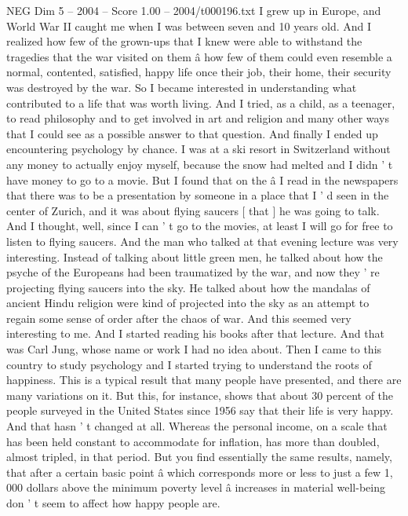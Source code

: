 \begin{textsample}{NEG Dim 5 – 2004 – Score 1.00 – 2004/t000196.txt}  \label{ex:f5_neg_066}
I grew up in Europe, and World War II caught me when I was between seven and 10 years old.
And I realized how few of the grown-ups that I knew were able to withstand the tragedies that the war visited on them â how few of them could even resemble a normal, contented, satisfied, happy life once their job, their home, their security was destroyed by the war.
So I became interested in understanding what contributed to a life that was worth living.
And I tried, as a child, as a teenager, to read philosophy and to get involved in art and religion and many other ways that I could see as a possible answer to that question.
And finally I ended up encountering psychology by chance.
I was at a ski resort in Switzerland without any money to actually enjoy myself, because the snow had melted and I didn ' t have money to go to a movie.
But I found that on the â I read in the newspapers that there was to be a presentation by someone in a place that I ' d seen in the center of Zurich, and it was about flying saucers [ that ] he was going to talk.
And I thought, well, since I can ' t go to the movies, at least I will go for free to listen to flying saucers.
And the man who talked at that evening lecture was very interesting.
Instead of talking about little green men, he talked about how the psyche of the Europeans had been traumatized by the war, and now they ' re projecting flying saucers into the sky.
He talked about how the mandalas of ancient Hindu religion were kind of projected into the sky as an attempt to regain some sense of order after the chaos of war.
And this seemed very interesting to me.
And I started reading his books after that lecture.
And that was Carl Jung, whose name or work I had no idea about.
Then I came to this country to study psychology and I started trying to understand the roots of happiness.
This is a typical result that many people have presented, and there are many variations on it.
But this, for instance, shows that about 30 percent of the people surveyed in the United States since 1956 say that their life is very happy.
And that hasn ' t changed at all.
Whereas the personal income, on a scale that has been held constant to accommodate for inflation, has more than doubled, almost tripled, in that period.
But you find essentially the same results, namely, that after a certain basic point â which corresponds more or less to just a few 1, 000 dollars above the minimum poverty level â increases in material well-being don ' t seem to affect how happy people are.

\end{textsample}
